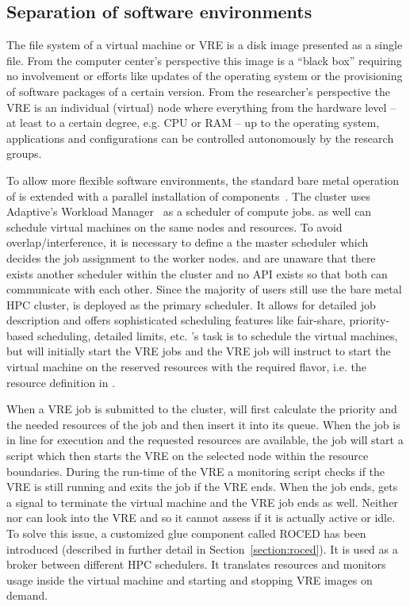 \subsection{Separation of software environments}

The file system of a virtual machine or VRE is a
disk image presented as a single file. From the computer center's perspective
this image is a ``black box'' requiring no involvement or efforts like
updates of the operating system or the provisioning of software packages of a
certain version. From the researcher's perspective the VRE is an individual
(virtual) node where everything from the hardware level -- at least to a
certain degree, e.g. CPU or RAM -- up to the operating system,
applications and configurations can be controlled autonomously by the research groups.

To allow more flexible software environments, the standard bare metal
operation of \NEMO is extended with a parallel installation of \Openstack
components~\cite{hpc-symp:2016}.
The \NEMO cluster uses Adaptive's \Moab Workload Manager~\cite{Moab} as a
scheduler of compute jobs.
\Openstack as well can schedule virtual machines on the same nodes and
resources.
To avoid overlap/interference, it is necessary to define a the master scheduler
which decides the job assignment to the worker nodes.
\Moab and \Openstack are
unaware that there exists another scheduler within the cluster and no API exists
so that both can communicate with each other. Since the majority of users still use the
bare metal HPC cluster, \Moab is deployed as the primary scheduler. It allows for
detailed job description and offers sophisticated scheduling features like
fair-share, priority-based scheduling, detailed limits,
etc. \Openstack 's task is to schedule the virtual machines, but \Moab will initially start the VRE
jobs and the VRE job will instruct \Openstack to start the virtual machine on the
reserved resources with the required flavor, i.e. the resource definition in \Openstack.

When a VRE job is submitted to the \NEMO cluster, \Moab will first calculate the
priority and the needed resources of the job and then insert it into its queue.
When the job is in line for execution and the requested resources are available,
the job will start a script which then starts the VRE on the selected node
within the resource boundaries. During the run-time of the VRE a monitoring
script checks if the VRE is still running and exits the job if the VRE ends.
When the job ends, \Openstack gets a signal to terminate the virtual machine and
the VRE job ends as well.  Neither \Moab nor \Openstack can look into the VRE and
so it cannot assess if it is actually active or idle. To solve this issue, a
customized glue component called ROCED has been introduced (described in
further detail in Section~\ref{section:roced}).  It is used as a broker between
different HPC schedulers. It translates resources and monitors usage inside the
virtual machine and starting and stopping VRE images on demand.
